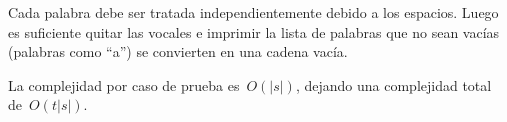 
Cada palabra debe ser tratada independientemente debido a los espacios. Luego es
suficiente quitar las vocales e imprimir la lista de palabras que no sean vacías
(palabras como ``a'') se convierten en una cadena vacía.

La complejidad por caso de prueba es~$O(|s|)$, dejando una complejidad total
de~$O(t |s|)$.

